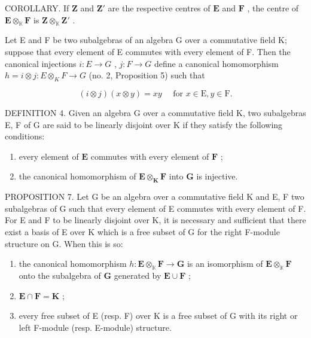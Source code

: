 COROLLARY. If \(\mathbf{Z}\) and \(\mathbf{Z}'\) are the respective centres of \(\mathbf{E}\) and \(\mathbf{F}\) , the centre of \(\mathbf{E} \otimes_{\mathbb{K}} \mathbf{F}\) is \(\mathbf{Z} \otimes_{\mathbb{K}} \mathbf{Z}'\) .

Let E and F be two subalgebras of an algebra G over a commutative field K; suppose that every element of E commutes with every element of F. Then the canonical injections \(i: E \to G\) , \(j: F \to G\) define a canonical homomorphism \(h = i \otimes j: E \otimes_{K} F \to G\) (no. 2, Proposition 5) such that

\[
(i \otimes j) (x \otimes y) = x y \quad \text { for } x \in \mathrm{E}, y \in \mathrm{F}.
\]

DEFINITION 4. Given an algebra G over a commutative field K, two subalgebras E, F of G are said to be linearly disjoint over K if they satisfy the following conditions:

\begin{enumerate}
\def\labelenumi{(\arabic{enumi})}
\item
  every element of \(\mathbf{E}\) commutes with every element of \(\mathbf{F}\) ;
\item
  the canonical homomorphism of \(\mathbf{E} \otimes_{\mathbf{K}} \mathbf{F}\) into \(\mathbf{G}\) is injective.
\end{enumerate}

PROPOSITION 7. Let G be an algebra over a commutative field K and E, F two subalgebras of G such that every element of E commutes with every element of F. For E and F to be linearly disjoint over K, it is necessary and sufficient that there exist a basis of E over K which is a free subset of G for the right F-module structure on G. When this is so:

\begin{enumerate}
\def\labelenumi{(\roman{enumi})}
\item
  the canonical homomorphism \(h: \mathbf{E} \otimes_{\mathbb{K}} \mathbf{F} \to \mathbf{G}\) is an isomorphism of \(\mathbf{E} \otimes_{\mathbb{K}} \mathbf{F}\) onto the subalgebra of \(\mathbf{G}\) generated by \(\mathbf{E} \cup \mathbf{F}\) ;
\item
  \(\mathbf{E} \cap \mathbf{F} = \mathbf{K}\) ;
\item
  every free subset of E (resp. F) over K is a free subset of G with its right or left F-module (resp. E-module) structure.
\end{enumerate}

